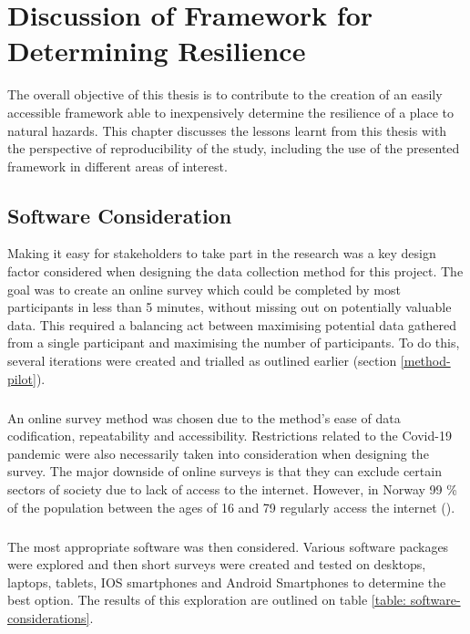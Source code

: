 
\chapter{Discussion of Framework for Determining Resilience}\label{discussion-framework}

The overall objective of this thesis is to contribute to the creation of an easily accessible framework able to inexpensively determine the resilience of a place to natural hazards. This chapter discusses the lessons learnt from this thesis with the perspective of reproducibility of the study, including the use of the presented framework in different areas of interest.

\section{Software Consideration}
Making it easy for stakeholders to take part in the research was a key design factor considered when designing the data collection method for this project. The goal was to create an online survey which could be completed by most participants in less than 5 minutes, without missing out on potentially valuable data. This required a balancing act between maximising potential data gathered from a single participant and maximising the number of participants. To do this, several iterations were created and trialled as outlined earlier (section \ref{method-pilot}).
\paragraph{}
An online survey method was chosen due to the method's ease of data codification, repeatability and accessibility. Restrictions related to the Covid-19 pandemic were also necessarily taken into consideration when designing the survey. The major downside of online surveys is that they can exclude certain sectors of society due to lack of access to the internet. However, in Norway 99 \% of the population between the ages of 16 and 79 regularly access the internet (\cite{walther-zhang_ict_2022}). 
\paragraph{}
The most appropriate software was then considered.  Various software packages were explored and then short surveys were created and  tested on desktops, laptops, tablets, IOS smartphones and Android Smartphones to determine the best option. The results of this exploration are outlined on table \ref{table: software-considerations}.

